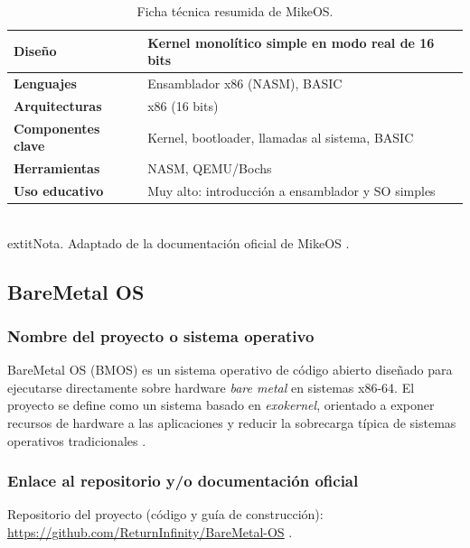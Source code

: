 \begin{table}[H]
    \centering
    \caption{Ficha técnica resumida de MikeOS.}
    \vspace{2mm}
    \begin{tabular}{p{4cm}p{10cm}}
        \hline
        \textbf{Diseño}            & Kernel monolítico simple en modo real de 16 bits   \\ \hline
        \textbf{Lenguajes}         & Ensamblador x86 (NASM), BASIC                      \\
        \textbf{Arquitecturas}     & x86 (16 bits)                                      \\
        \textbf{Componentes clave} & Kernel, bootloader, llamadas al sistema, BASIC     \\
        \textbf{Herramientas}      & NASM, QEMU/Bochs                                   \\
        \textbf{Uso educativo}     & Muy alto: introducción a ensamblador y SO simples  \\
        \hline
    \end{tabular}
    \vspace{1mm} \\
    	extit{Nota. Adaptado de la documentación oficial de MikeOS \cite{mikeos_about, mikeos_purpose}.}
\end{table}

\subsection{BareMetal OS}

\subsubsection{Nombre del proyecto o sistema operativo}
BareMetal OS (BMOS) es un sistema operativo de código abierto diseñado para ejecutarse directamente sobre hardware \textit{bare metal} en sistemas x86-64. El proyecto se define como un sistema basado en \textit{exokernel}, orientado a exponer recursos de hardware a las aplicaciones y reducir la sobrecarga típica de sistemas operativos tradicionales \cite{bmos_purpose}.

\subsubsection{Enlace al repositorio y/o documentación oficial}
Repositorio del proyecto (código y guía de construcción): \url{https://github.com/ReturnInfinity/BareMetal-OS} \cite{bmos_purpose}.

